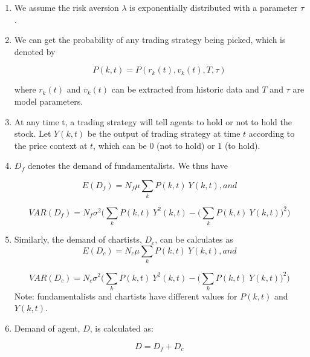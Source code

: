 \begin{enumerate}
{where $T$ is a temperature determining how sophisticated the traders are and how intensively the traders are coupled.
}

\item {We assume the risk aversion $\lambda$ is exponentially distributed with a parameter $\tau$.
}

\item {We can get the probability of any trading strategy being picked, which is denoted by

\begin{equation} \label{prob_eq}
P(k,t) = P(r_k(t), v_k(t), T, \tau)
\end{equation}

where $r_k (t)$ and $v_k (t)$ can be extracted from historic data and $T$ and $\tau$ are model parameters.
}

\item {At any time t, a trading strategy will tell agents to hold or not to hold the stock. Let $Y(k,t)$ be the output of trading strategy at time $t$ according to the price context at $t$, which can be 0 (not to hold) or 1 (to hold).
}

\item {$D_f$ denotes the demand of fundamentalists. We thus have

\begin{equation}
E(D_f) = N_f\mu \sum_{k} P(k,t)\ Y(k,t), and
\end{equation}

\begin{equation}
VAR(D_f) = N_f\sigma^2 \Big(\sum_{k}P(k,t)\ Y^2(k,t)- \big(\sum_{k} P(k,t)\ Y(k,t)\big)^2 \Big)
\end{equation}
}

\item {Similarly, the demand of chartists, $D_c$, can be calculates as
\begin{equation}
E(D_c) = N_c\mu \sum_{k} P(k,t)\ Y(k,t) , and
\end{equation}

\begin{equation}
VAR(D_c) = N_c\sigma^2 \Big(\sum_{k}P(k,t)\ Y^2(k,t)- \big(\sum_{k} P(k,t)\ Y(k,t)\big)^2 \Big)
\end{equation}
Note: fundamentalists and chartists have different values for $P(k,t)$ and $Y(k,t)$.
}

\item {Demand of agent, $D$, is calculated as:

\begin{equation}
 D = D_{f} + D_{c}
\end{equation}
 
}
\end{enumerate}
